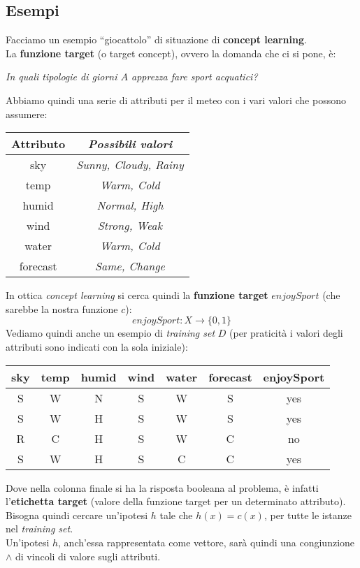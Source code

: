 \subsection{Esempi}
\begin{esempio}
  Facciamo un esempio ``giocattolo'' di situazione di \textbf{concept
    learning}.\\ 
  La \textbf{funzione target} (o target concept), ovvero la domanda che ci si pone, è:\\
  \begin{center}
    \textit{In quali tipologie di giorni $A$ apprezza fare sport acquatici?}
  \end{center}
  Abbiamo quindi una serie di attributi per il meteo con i vari valori che
  possono assumere:
  \begin{table}[H]
    \centering
    \begin{tabular}[H]{|c|c|}
      \hline
      \textbf{Attributo} & \textbf{\textit{Possibili valori}}\\
      \hline
      sky & \textit{Sunny, Cloudy, Rainy}\\
      temp & \textit{Warm, Cold}\\
      humid & \textit{Normal, High}\\
      wind & \textit{Strong, Weak}\\
      water & \textit{Warm, Cold}\\
      forecast & \textit{Same, Change}\\
      \hline
    \end{tabular}
  \end{table}
  In ottica \textit{concept learning} si cerca quindi la \textbf{funzione
    target} $enjoySport$ (che sarebbe la nostra funzione $c$): 
  \[enjoySport:X\to\{0, 1\}\]
  Vediamo quindi anche un esempio di \textit{training set} $D$ (per praticità i
  valori degli attributi sono indicati con la sola iniziale):
  \begin{table}[H]
    \centering
    \begin{tabular}[H]{|c|c|c|c|c|c|c|}
      \hline
      \textbf{sky} & \textbf{temp} & \textbf{humid} & \textbf{wind} &         
      \textbf{water} & \textbf{forecast} & \textbf{enjoySport}\\
      \hline
      S & W & N & S & W & S & \color{darkgreen} yes\\
      S & W & H & S & W & S & \color{darkgreen} yes\\
      R & C & H & S & W & C & \color{red} no\\
      S & W & H & S & C & C & \color{darkgreen} yes\\
      \hline
    \end{tabular}
  \end{table}
  Dove nella colonna finale si ha la risposta booleana al problema, è infatti
  l'\textbf{etichetta target} (valore della funzione target per un determinato attributo).\\
  Bisogna quindi cercare un'ipotesi $h$ tale che $h(x)=c(x)$,
  per tutte le istanze nel \textit{training set}.\\
  Un'ipotesi $h$, anch'essa rappresentata come vettore, sarà quindi una
  congiunzione $\land$ di vincoli di valore sugli attributi.
  \label{es:tab}
\end{esempio}
